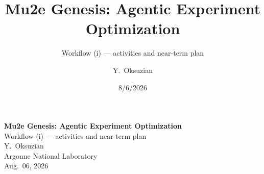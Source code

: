 \documentclass[aspectratio=169,10pt]{beamer}
\title{\textcolor{fnalblue}{\textbf{Mu2e Genesis: Agentic Experiment Optimization}}}
\subtitle{\textcolor{fnalblue}{Workflow (i) --- activities and near-term plan}}
\author{Y.\ Oksuzian}
\institute{Argonne National Laboratory}
\date{8/6/2026}
\begin{document}
\begin{frame}[plain]
\vspace{2.2em}
\begin{center}
{\LARGE\bfseries\color{fnalblue} Mu2e Genesis: Agentic Experiment Optimization}\\[0.8em]
{\large\color{fnalblue} Workflow (i) --- activities and near-term plan}\\[3.5em]
{\large Y.\ Oksuzian}\\[0.3em]
{\large Argonne National Laboratory}\\[0.3em]
{\large Aug.\ 06, 2026}
\end{center}
\end{frame}

\end{document}
